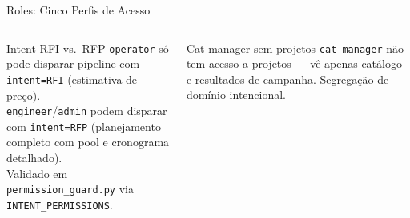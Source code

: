 \documentclass[aspectratio=169,10pt]{beamer}
\newcommand{\role}[1]{\texttt{\small #1}}
\begin{document}
\begin{frame}{Roles: Cinco Perfis de Acesso}
\begin{columns}[T]
    \begin{alertblock}{\small Intent RFI vs.\ RFP}
      \scriptsize \role{operator} só pode disparar pipeline com
      \texttt{intent=RFI} (estimativa de preço).\\[4pt]
      \role{engineer}/\role{admin} podem disparar com
      \texttt{intent=RFP} (planejamento completo com pool e cronograma detalhado).\\[4pt]
      Validado em \texttt{permission\_guard.py} via \texttt{INTENT\_PERMISSIONS}.
    \end{alertblock}
    \vspace{4pt}
    \begin{exampleblock}{\small Cat-manager sem projetos}
      \scriptsize \role{cat-manager} não tem acesso a projetos ---
      vê apenas catálogo e resultados de campanha.
      Segregação de domínio intencional.
    \end{exampleblock}
  \end{columns}
\end{frame}
\end{document}
